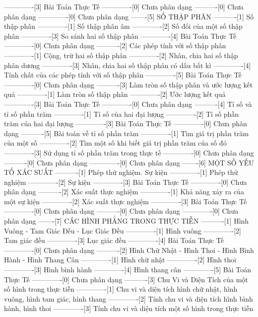 -------------[3] Bài Toán Thực Tế
-------------[0] Chưa phân dạng
----------[0] Chưa phân dạng
-------------[0] Chưa phân dạng
-------[5] SỐ THẬP PHÂN
----------[1] Số thập phân
-------------[1] Số thập phân âm
-------------[2] Số đối của một số thập phân
-------------[3] So sánh hai số thập phân
-------------[4] Bài Toán Thực Tế
-------------[0] Chưa phân dạng
----------[2] Các phép tính với số thập phân
-------------[1] Cộng, trừ hai số thập phân
-------------[2] Nhân, chia hai số thập phân dương
-------------[3] Nhân, chia hai số thập phân có dấu bất kì
-------------[4] Tính chất của các phép tính với số thập phân
-------------[5] Bài Toán Thực Tế
-------------[0] Chưa phân dạng
----------[3] Làm tròn số thập phân và ước lượng kết quả
-------------[1] Làm tròn số thập phân
-------------[2] Ước lượng kết quả
-------------[3] Bài Toán Thực Tế
-------------[0] Chưa phân dạng
----------[4] Tỉ số và tỉ số phần trăm
-------------[1] Tỉ số của hai đại lượng
-------------[2] Tỉ số phần trăm của hai đại lượng
-------------[3] Bài Toán Thực Tế
-------------[0] Chưa phân dạng
----------[5] Bài toán về tỉ số phần trăm
-------------[1] Tìm giá trị phần trăm của một số
-------------[2] Tìm một số khi biết giá trị phần trăm của số đó
-------------[3] Sử dụng tỉ số phần trăm trong thực tế
-------------[0] Chưa phân dạng
----------[0] Chưa phân dạng
-------------[0] Chưa phân dạng
-------[6] MỘT SỐ YẾU TỐ XÁC SUẤT
----------[1] Phép thử nghiệm. Sự kiện
-------------[1] Phép thử nghiệm
-------------[2] Sự kiện
-------------[3] Bài Toán Thực Tế
-------------[0] Chưa phân dạng
----------[2] Xác suất thực nghiệm
-------------[1] Khả năng xảy ra của một sự kiện
-------------[2] Xác suất thực nghiệm
-------------[3] Bài Toán Thực Tế
-------------[0] Chưa phân dạng
----------[0] Chưa phân dạng
-------------[0] Chưa phân dạng
-------[7] CÁC HÌNH PHẲNG TRONG THỰC TIỄN
----------[1] Hình Vuông - Tam Giác Đều - Lục Giác Đều
-------------[1] Hình vuông
-------------[2] Tam giác đều
-------------[3] Lục giác đều
-------------[4] Bài Toán Thực Tế
-------------[0] Chưa phân dạng
----------[2] Hình Chữ Nhật - Hình Thoi - Hình Bình Hành - Hình Thang Cân
-------------[1] Hình chữ nhật
-------------[2] Hình thoi
-------------[3] Hình bình hành
-------------[4] Hình thang cân
-------------[5] Bài Toán Thực Tế
-------------[0] Chưa phân dạng
----------[3] Chu Vi và Diện Tích của một số hình trong thực tiễn
-------------[1] Chu vi và diện tích hình chữ nhật, hình vuông, hình tam giác, hình thang
-------------[2] Tính chu vi và diện tích hình bình hành, hình thoi
-------------[3] Tính chu vi và diện tích một số hình trong thực tiễn

